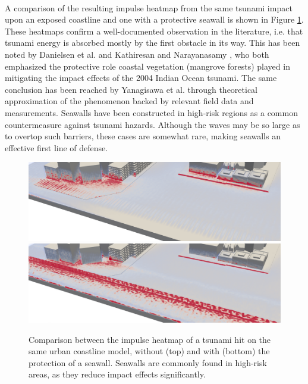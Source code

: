 \documentclass{llncs}
\begin{document}
\paragraph{} A comparison of the resulting impulse heatmap from the same tsunami impact
upon an exposed coastline and one with a protective seawall is shown in Figure
\ref{fig:impulse-heatmaps-seawall}. These heatmaps confirm a well-documented observation
in the literature, i.e. that tsunami energy is absorbed mostly by the first obstacle in
its way. This has been noted by Danielsen et al. \cite{danielsen2005asian} and Kathiresan
and Narayanasamy \cite{kathiresan2005601}, who both emphasized the protective role coastal
vegetation (mangrove forests) played in mitigating the impact effects of the 2004 Indian
Ocean tsunami. The same conclusion has been reached by Yanagisawa et
al. \cite{yanagisawa200927} through theoretical approximation of the phenomenon backed by
relevant field data and measurements. Seawalls have been constructed in high-risk regions
as a common countermeasure against tsunami hazards. Although the waves may be so large as
to overtop such barriers, these cases are somewhat rare, making seawalls an effective
first line of defense.

\begin{figure}
  \includegraphics[width=\textwidth]{figures/if-city0-free.png}
  \includegraphics[width=\textwidth]{figures/if-city0-seawall.png}
  \caption{Comparison between the impulse heatmap of a tsunami hit on the same urban
    coastline model, without (top) and with (bottom) the protection of a seawall. Seawalls
    are commonly found in high-risk areas, as they reduce impact effects significantly.}
  \label{fig:impulse-heatmaps-seawall}
\end{figure}
\end{document}
